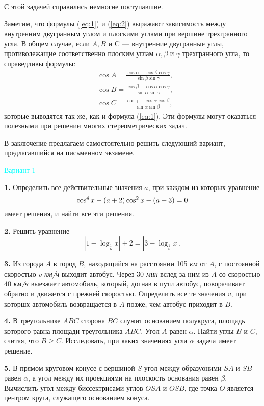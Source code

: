 \begin{multicols}{2}
С этой задачей справились немногне поступавшие.

Заметим, что формулы (\ref{eq:1}) и (\ref{eq:2}) выражают зависимость между внутренним двугранным углом и плоскими углами при вершине трехгранного угла. В общем случае, если $A, B$ и C --- внутренние двугранные углы, противолежащие соответственно плоским углам $\alpha, \beta$ и $\gamma$ трехгранного угла, то справедливы формулы:
$$
\begin{aligned}
& \cos A=\frac{\cos \alpha-\cos \beta \cos \gamma}{\sin \beta \sin \gamma}, \\
& \cos B=\frac{\cos \beta-\cos \alpha \cos \gamma}{\sin \alpha \sin \gamma}, \\
& \cos C=\frac{\cos \gamma-\cos \alpha \cos \beta}{\sin \alpha \sin \beta},
\end{aligned}
$$
которые выводятся так же, как и формула (\ref{eq:1}). Эти формулы могут оказаться полезными при решении многих стереометрических задач.

В заключение предлагаем самостоятельно решить следующий вариант, предлагавшийся на письменном экзамене.

    \begin{center}
        \textcolor{cyan}{Вариант 1}
    \end{center}
    
    \textbf{1.} Определить все действительные значения $a$, при каждом из которых уравнение
    $$
    \cos ^4 x-(a+2) \cos ^2 x-(a+3)=0 \\
    $$
    имеет решения, и найти все эти решения.
    
    \textbf{2.} Решить уравнение
    $$
    \left|1-\log _{\frac{1}{6}} x\right|+2=\left|3-\log _{\frac{1}{6}} x\right| .
    $$
    
    \textbf{3.} Из города $A$ в город $B$, находящийся на расстоянии 105 \textit{км} от $A$, с постоянной скоростью $v$ \textit{км/ч} выходит автобус. Через 30 \textit{мин} вслед за ним из $A$ со скоростью $40$ \textit{км/ч} выезжает автомобиль, который, догнав в пути автобус, поворачивает обратно и движется с прежней скоростью. Oпределить все те значения $v$, при которшх автомобиль возвращается в $A$ позже, чем автобус приходит в $B$.
    
    \textbf{4.} В треугольнике $A B C$ сторона $B C$ служит основанием полукруга, площадь которого равна площади треугольника $A B C$. Угол $A$ равен $\alpha$. Найти углы $B$ и $C$, считая, что $B \geqslant C$. Исследовать, при каких значениях угла $\alpha$ задача имеет решение.
    
    \textbf{5.} В прямом круговом конусе с вершиной $S$ угол между образуоними $S A$ и $S B$ равен $\alpha$, а угол между их проекциями на плоскость основания равен $\beta$. Вычислить угол между биссектрисами углов $O S A$ и $O S B$, где точка $O$ является центром круга, служащего основанием конуса.

\end{multicols}